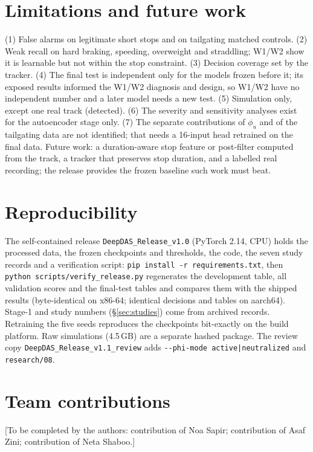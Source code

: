 \documentclass[10pt,a4paper,twocolumn]{article}
\begin{document}
\section{Limitations and future work}
(1) False alarms on legitimate short stops and on tailgating matched controls. (2) Weak recall on hard braking, speeding, overweight and straddling; W1/W2 show it is learnable but not within the stop constraint. (3) Decision coverage set by the tracker. (4) The final test is independent only for the models frozen before it; its exposed results informed the W1/W2 diagnosis and design, so W1/W2 have no independent number and a later model needs a new test. (5) Simulation only, except one real track (detected). (6) The severity and sensitivity analyses exist for the autoencoder stage only. (7) The separate contributions of $\phi_u$ and of the tailgating data are not identified; that needs a 16-input head retrained on the final data. Future work: a duration-aware stop feature or post-filter computed from the track, a tracker that preserves stop duration, and a labelled real recording; the release provides the frozen baseline such work must beat.

\section{Reproducibility}
The self-contained release \texttt{DeepDAS\_Release\_v1.0} (PyTorch 2.14, CPU) holds the processed data, the frozen checkpoints and thresholds, the code, the seven study records and a verification script: \texttt{pip install -r requirements.txt}, then \texttt{python scripts/verify\_release.py} regenerates the development table, all validation scores and the final-test tables and compares them with the shipped results (byte-identical on x86-64; identical decisions and tables on aarch64). Stage-1 and study numbers (\S\ref{sec:studies}) come from archived records. Retraining the five seeds reproduces the checkpoints bit-exactly on the build platform. Raw simulations (4.5\,GB) are a separate hashed package. The review copy \texttt{DeepDAS\_Release\_v1.1\_review} adds \texttt{-{}-phi-mode active|neutralized} and \texttt{research/08}.

\balance
\section*{Team contributions}
\textcolor{note}{[To be completed by the authors: contribution of Noa Sapir; contribution of Asaf Zini; contribution of Neta Shaboo.]}
\end{document}
